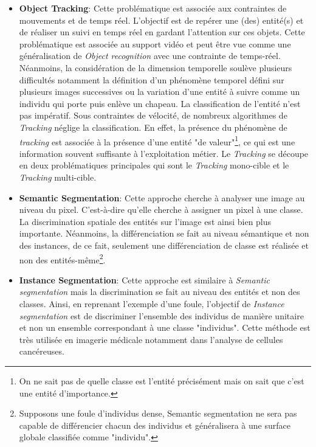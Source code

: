 \begin{itemize}
    \item \textbf{Object Tracking}: Cette problématique est associée aux contraintes de mouvements et de temps réel. L'objectif est de repérer une (des) entité(s) et de réaliser un suivi en temps réel en gardant l'attention sur ces objets. Cette problématique est associée au support vidéo et peut être vue comme une généralisation de \textit{Object recognition} avec une contrainte de temps-réel. Néanmoins, la considération de la dimension temporelle soulève plusieurs difficultés notamment la définition d'un phénomène temporel défini sur plusieurs images successives ou la variation d'une entité à suivre comme un individu qui porte puis enlève un chapeau. La classification de l'entité n'est pas impératif. Sous contraintes de vélocité, de nombreux algorithmes de \textit{Tracking} néglige la classification. En effet, la présence du phénomène de \textit{tracking} est associée à la présence d'une entité "de valeur"\footnote{On ne sait pas de quelle classe est l'entité précisément mais on sait que c'est une entité d'importance.}, ce qui est une information souvent suffisante à l'exploitation métier. Le \textit{Tracking} se découpe en deux problématiques principales qui sont le \textit{Tracking} mono-cible et le \textit{Tracking} multi-cible.

    \item \textbf{Semantic Segmentation}: Cette approche cherche à analyser une image au niveau du pixel. C'est-à-dire qu'elle cherche à assigner un pixel à une classe. La discrimination spatiale des entités sur l'image est ainsi bien plus importante. Néanmoins, la différenciation se fait au niveau sémantique et non des instances, de ce fait, seulement une différenciation de classe est réalisée et non des entités-même\footnote{Supposons une foule d'individus dense, Semantic segmentation ne sera pas capable de différencier chacun des individus et généralisera à une surface globale classifiée comme "individu".}.

    \item \textbf{Instance Segmentation}: Cette approche est similaire à \textit{Semantic segmentation} mais la discrimination se fait au niveau des entités et non des classes. Ainsi, en reprenant l'exemple d'une foule, l'objectif de \textit{Instance segmentation} est de discriminer l'ensemble des individus de manière unitaire et non un ensemble correspondant à une classe "individus". Cette méthode est très utilisée en imagerie médicale notamment dans l'analyse de cellules cancéreuses.


\end{itemize}

